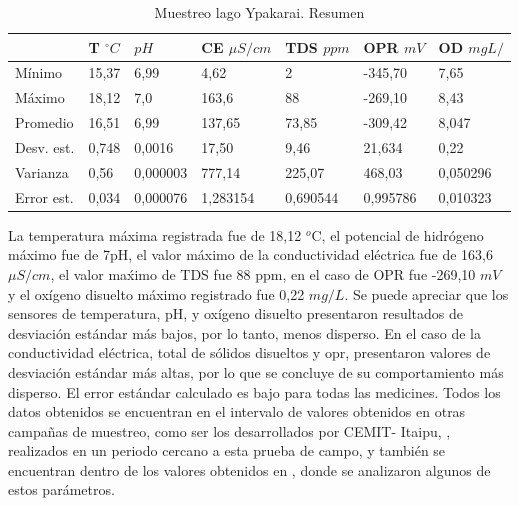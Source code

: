 \begin{table}[H]
\caption{Muestreo lago Ypakarai. Resumen}
\label{tab:datos Lago}
\begin{tabular}{lllllll} \hline& 
T  $^{\circ}C$ & $pH$     & CE $\mu S/cm$ & TDS $ppm$ & OPR $mV$ & OD $mgL/$  \\ \hline
M\'inimo & 15,37 & 6,99 & 4,62 & 2    & -345,70  & 7,65     \\
M\'aximo & 18,12 & 7,0   & 163,6    & 88    & -269,10  & 8,43 \\
Promedio & 16,51  & 6,99 & 137,65 & 73,85 & -309,42  & 8,047 \\
Desv. est. & 0,748 & 0,0016   & 17,50   & 9,46     & 21,634   & 0,22     \\
Varianza                & 0,56           & 0,000003 & 777,14        & 225,07    & 468,03   & 0,050296 \\
Error est.               & 0,034 & 0,000076 & 1,283154 & 0,690544 & 0,995786 & 0,010323 \\
\hline
\end{tabular}
\end{table}
La temperatura m\'axima registrada fue de 18,12 $^o$C, el potencial de hidr\'ogeno m\'aximo fue de 7pH, el valor m\'aximo de la conductividad el\'ectrica fue de 163,6 $\mu S/cm$, el valor ma\'ximo de TDS fue 88 ppm, en el caso de OPR fue -269,10 $mV$ y el ox\'igeno disuelto máximo registrado fue 0,22 $mg/L$.
Se puede apreciar que los sensores de temperatura, pH, y ox\'igeno disuelto presentaron resultados de desviación estándar m\'as bajos, por lo tanto, menos disperso. En el caso de la conductividad eléctrica, total de s\'olidos disueltos y opr, presentaron valores de desviación estándar m\'as altas, por lo que se concluye de su comportamiento m\'as disperso.
El error estándar calculado es bajo para todas las medicines. 
Todos los datos obtenidos se encuentran en el intervalo de valores obtenidos en otras campa\~nas de muestreo, como ser los desarrollados por CEMIT- Itaipu, \cite{3er_Cemit}\cite{4to_Cemit}, realizados en un periodo cercano a esta prueba de campo, y también se encuentran dentro de los valores obtenidos en \cite{lopez_moreira_m_eutrophication_2018}, donde se analizaron algunos de estos parámetros.  


